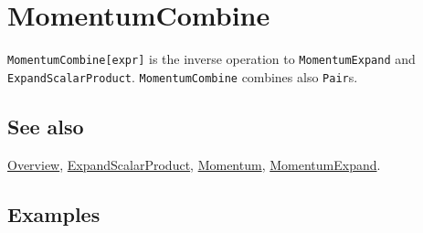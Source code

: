 \documentclass[../FeynCalcManual.tex]{subfiles}
\begin{document}
\begin{Shaded}
\begin{Highlighting}[]
 
\end{Highlighting}
\end{Shaded}

\hypertarget{momentumcombine}{
\section{MomentumCombine}\label{momentumcombine}}

\texttt{MomentumCombine[\allowbreak{}expr]} is the inverse operation to
\texttt{MomentumExpand} and \texttt{ExpandScalarProduct}.
\texttt{MomentumCombine} combines also \texttt{Pair}s.

\subsection{See also}

\hyperlink{toc}{Overview},
\hyperlink{expandscalarproduct}{ExpandScalarProduct},
\hyperlink{momentum}{Momentum},
\hyperlink{momentumexpand}{MomentumExpand}.

\subsection{Examples}

\begin{Shaded}
\begin{Highlighting}[]
\OperatorTok{[}\OperatorTok{]} \SpecialCharTok{{-}} \OperatorTok{[}\OperatorTok{]} \SpecialCharTok{//}\SpecialCharTok{//} 

\end{Highlighting}
\end{Shaded}

\begin{Shaded}
\begin{Highlighting}[]
\OperatorTok{[}\OperatorTok{,} \SpecialCharTok{\textbackslash{}}\OperatorTok{[}\OperatorTok{]]} \SpecialCharTok{+} \OperatorTok{[}\OperatorTok{,} \SpecialCharTok{\textbackslash{}}\OperatorTok{[}\OperatorTok{]]} 
 
\ExtensionTok{=}\OperatorTok{[}\SpecialCharTok{\%}\OperatorTok{]}
\end{Highlighting}
\end{Shaded}
\end{document}
